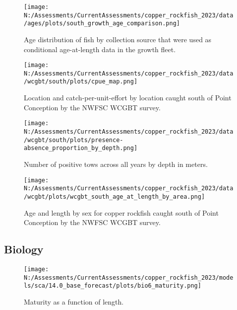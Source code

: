 \documentclass[11pt,
  english,
  letterpaper,
]{article}
\begin{document}
\pagebreak

\begin{figure}
\centering
\texttt{[image: N:/Assessments/CurrentAssessments/copper\_rockfish\_2023/data/ages/plots/south\_growth\_age\_comparison.png]}
\caption{Age distribution of fish by collection source that were used as conditional age-at-length data in the growth fleet.\label{fig:growth-age-dist}}
\end{figure}

\pagebreak

\begin{figure}
\centering
\texttt{[image: N:/Assessments/CurrentAssessments/copper\_rockfish\_2023/data/wcgbt/south/plots/cpue\_map.png]}
\caption{Location and catch-per-unit-effort by location caught south of Point Conception by the NWFSC WCGBT survey.\label{fig:wcgbt-cpue}}
\end{figure}

\pagebreak

\begin{figure}
\centering
\texttt{[image: N:/Assessments/CurrentAssessments/copper\_rockfish\_2023/data/wcgbt/south/plots/presence-absence\_proportion\_by\_depth.png]}
\caption{Number of positive tows across all years by depth in meters.\label{fig:wcgbt-depth}}
\end{figure}

\pagebreak

\begin{figure}
\centering
\texttt{[image: N:/Assessments/CurrentAssessments/copper\_rockfish\_2023/data/wcgbt/plots/wcgbt\_south\_age\_at\_length\_by\_area.png]}
\caption{Age and length by sex for copper rockfish caught south of Point Conception by the NWFSC WCGBT survey.\label{fig:wcgbt-len-age}}
\end{figure}

\pagebreak

\hypertarget{biology}{%
\subsection{Biology}\label{biology}}

\begin{figure}
\centering
\texttt{[image: N:/Assessments/CurrentAssessments/copper\_rockfish\_2023/models/sca/14.0\_base\_forecast/plots/bio6\_maturity.png]}
\caption{Maturity as a function of length.\label{fig:maturity}}
\end{figure}
\end{document}
